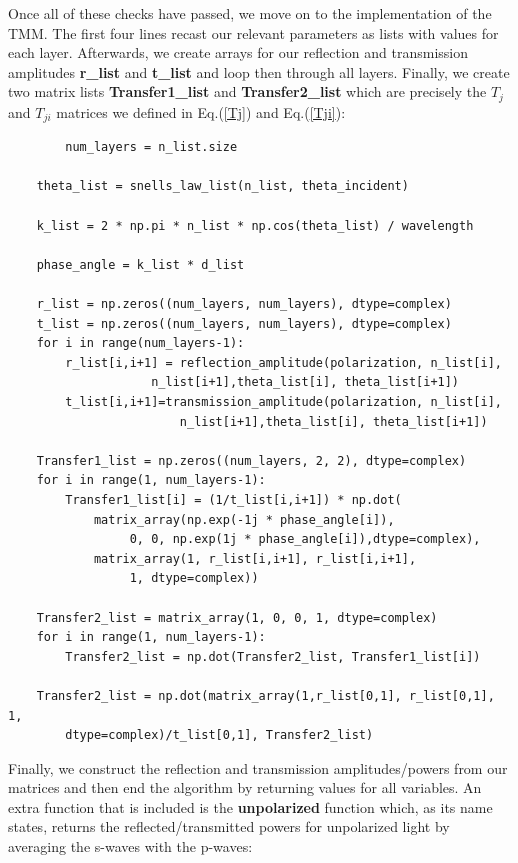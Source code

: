 \documentclass[preprint, onecolumn, amsmath, amssymb, aps]{revtex4-1}
\numberwithin{equation}{section}
\begin{document}
\noindent           
Once all of these checks have passed, we move on to the implementation of the TMM. The first four lines recast our relevant parameters as lists with values for each layer. Afterwards, we create arrays for our reflection and transmission amplitudes \textbf{r\_list} and \textbf{t\_list} and loop then through all layers. Finally, we create two matrix lists \textbf{Transfer1\_list} and \textbf{Transfer2\_list} which are precisely the $T_{j}$ and $T_{ji}$ matrices we defined in Eq.(\ref{Tj}) and Eq.(\ref{Tji}):
\lstset{showspaces=false,showstringspaces=false}%
\begin{lstlisting}
        num_layers = n_list.size

	theta_list = snells_law_list(n_list, theta_incident)

	k_list = 2 * np.pi * n_list * np.cos(theta_list) / wavelength

	phase_angle = k_list * d_list

	r_list = np.zeros((num_layers, num_layers), dtype=complex)
	t_list = np.zeros((num_layers, num_layers), dtype=complex) 
	for i in range(num_layers-1):
		r_list[i,i+1] = reflection_amplitude(polarization, n_list[i],
   			        n_list[i+1],theta_list[i], theta_list[i+1])
		t_list[i,i+1]=transmission_amplitude(polarization, n_list[i], 
		                n_list[i+1],theta_list[i], theta_list[i+1])

	Transfer1_list = np.zeros((num_layers, 2, 2), dtype=complex)
	for i in range(1, num_layers-1):
		Transfer1_list[i] = (1/t_list[i,i+1]) * np.dot(
			matrix_array(np.exp(-1j * phase_angle[i]), 
			     0, 0, np.exp(1j * phase_angle[i]),dtype=complex),
			matrix_array(1, r_list[i,i+1], r_list[i,i+1],
			     1, dtype=complex))

	Transfer2_list = matrix_array(1, 0, 0, 1, dtype=complex)
	for i in range(1, num_layers-1):
		Transfer2_list = np.dot(Transfer2_list, Transfer1_list[i])

	Transfer2_list = np.dot(matrix_array(1,r_list[0,1], r_list[0,1], 1,
		dtype=complex)/t_list[0,1], Transfer2_list)
\end{lstlisting}
\noindent
Finally, we construct the reflection and transmission amplitudes/powers from our matrices and then end the algorithm by returning values for all variables. An extra function that is included is the \textbf{unpolarized} function which, as its name states, returns the reflected/transmitted powers for unpolarized light by averaging the s-waves with the p-waves: 
\lstset{showspaces=false,showstringspaces=false}%
\end{document}
